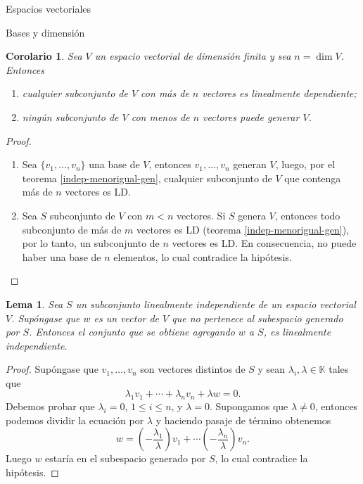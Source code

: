 \documentclass[a4paper,12pt,twoside,spanish]{amsbook}
\newtheorem{corolario}[teorema]{Corolario}
\newtheorem{lema}[teorema]{Lema}
\theoremstyle{definition}
\theoremstyle{remark}
\newcommand{\K}{\mathbb K}
\begin{document}
\begin{chapter}{Espacios vectoriales}
\begin{section}{Bases y dimensión}
		
		\begin{corolario}
			Sea $V$ un espacio vectorial de dimensión finita y sea $n = \dim V$. 
			Entonces
			\begin{enumerate}
				\item cualquier subconjunto de $V$ con más de $n$ vectores es linealmente
				dependiente;
				\item ningún subconjunto de $V$ con menos de $n$ vectores puede generar $V$.
			\end{enumerate} 
		\end{corolario}
	\begin{proof}
		\begin{enumerate}
			\item Sea $\{v_1,\ldots,v_n\}$ una base de $V$, entonces $v_1,\ldots,v_n$ generan $V$, luego, por el teorema \ref{indep-menorigual-gen}, cualquier subconjunto de $V$ que contenga más de $n$ vectores es LD.
			\item Sea $S$  subconjunto de $V$ con $m < n$ vectores. Si $S$  genera $V$,  entonces todo subconjunto de más de $m$  vectores es LD (teorema \ref{indep-menorigual-gen}), por lo tanto, un subconjunto de $n$ vectores es LD. En  consecuencia, no puede haber una base de $n$  elementos, lo cual contradice la hipótesis.
		\end{enumerate} 
	\end{proof}

	\begin{lema}\label{li+vec=li}
		Sea $S$ un subconjunto linealmente independiente de un espacio vectorial $V$. Supóngase que $w$ es un vector de $V$ que no pertenece al subespacio generado por $S$. Entonces el conjunto que se obtiene agregando $w$  a $S$, es linealmente independiente.
	\end{lema}
	\begin{proof}
		Supóngase que $v_1,\ldots,v_n$  son vectores distintos de $S$ y sean $\lambda_i,\lambda \in \K$  tales que
		\begin{equation}\label{eq-dep-lin}
			\lambda_1 v_1 + \cdots + \lambda_n v_n + \lambda w =0 .
		\end{equation}
		Debemos probar que $\lambda_i=0$, $1 \le i \le n$, y $\lambda =0$.
		Supongamos que $\lambda \ne 0$, entonces podemos dividir la ecuación por $\lambda$ y haciendo  pasaje de término  obtenemos
		$$
		w = \left(-\frac{\lambda_1}{\lambda}\right) v_1 + \cdots   \left(-\frac{\lambda_n}{\lambda}\right) v_n.
		$$
		Luego $w$ estaría  en el subespacio generado por $S$, lo cual contradice la hipótesis. 
		

\end{proof}
\end{section}
\end{chapter}
\end{document}
